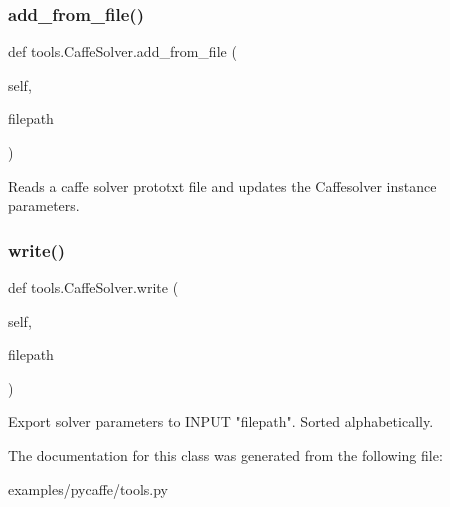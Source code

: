 \subsubsection{\texorpdfstring{add\+\_\+from\+\_\+file()}{add\_from\_file()}}
{\footnotesize\ttfamily def tools.\+Caffe\+Solver.\+add\+\_\+from\+\_\+file (\begin{DoxyParamCaption}\item[{}]{self,  }\item[{}]{filepath }\end{DoxyParamCaption})}

\begin{DoxyVerb}Reads a caffe solver prototxt file and updates the Caffesolver
instance parameters.
\end{DoxyVerb}
 \mbox{\label{classtools_1_1_caffe_solver_abad47d0b093c19b5ffa754f58cc62300}} 
\subsubsection{\texorpdfstring{write()}{write()}}
{\footnotesize\ttfamily def tools.\+Caffe\+Solver.\+write (\begin{DoxyParamCaption}\item[{}]{self,  }\item[{}]{filepath }\end{DoxyParamCaption})}

\begin{DoxyVerb}Export solver parameters to INPUT "filepath". Sorted alphabetically.
\end{DoxyVerb}
 

The documentation for this class was generated from the following file\+:\begin{DoxyCompactItemize}
\item 
examples/pycaffe/tools.\+py\end{DoxyCompactItemize}
